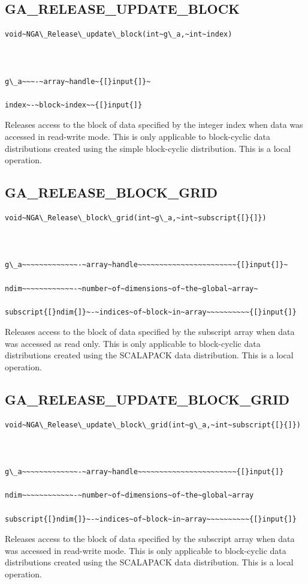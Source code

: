 \subsection*{\label{sub:GA_RELEASE_UPDATE_BLOCK}GA\_RELEASE\_UPDATE\_BLOCK}
\begin{verbatim}
void~NGA\_Release\_update\_block(int~g\_a,~int~index)



g\_a~~~-~array~handle~{[}input{]}~

index~-~block~index~~{[}input{]}
\end{verbatim}
Releases access to the block of data specified by the integer index
when data was accessed in read-write mode. This is only applicable
to block-cyclic data distributions created using the simple block-cyclic
distribution. This is a local operation. 


\subsection*{\label{sub:GA_RELEASE_BLOCK_GRID}GA\_RELEASE\_BLOCK\_GRID}
\begin{verbatim}
void~NGA\_Release\_block\_grid(int~g\_a,~int~subscript{[}{]})



g\_a~~~~~~~~~~~~~-~array~handle~~~~~~~~~~~~~~~~~~~~~~~{[}input{]}~

ndim~~~~~~~~~~~~-~number~of~dimensions~of~the~global~array~

subscript{[}ndim{]}~-~indices~of~block~in~array~~~~~~~~~~{[}input{]}
\end{verbatim}
Releases access to the block of data specified by the subscript array
when data was accessed as read only. This is only applicable to block-cyclic
data distributions created using the SCALAPACK data distribution.
This is a local operation. 


\subsection*{\label{sub:GA_RELEASE_UPDATE_BLOCK_GRID}GA\_RELEASE\_UPDATE\_BLOCK\_GRID}
\begin{verbatim}
void~NGA\_Release\_update\_block\_grid(int~g\_a,~int~subscript{[}{]})



g\_a~~~~~~~~~~~~~-~array~handle~~~~~~~~~~~~~~~~~~~~~~~{[}input{]}

ndim~~~~~~~~~~~~-~number~of~dimensions~of~the~global~array

subscript{[}ndim{]}~-~indices~of~block~in~array~~~~~~~~~~{[}input{]}
\end{verbatim}
Releases access to the block of data specified by the subscript array
when data was accessed in read-write mode. This is only applicable
to block-cyclic data distributions created using the SCALAPACK data
distribution. This is a local operation. 


